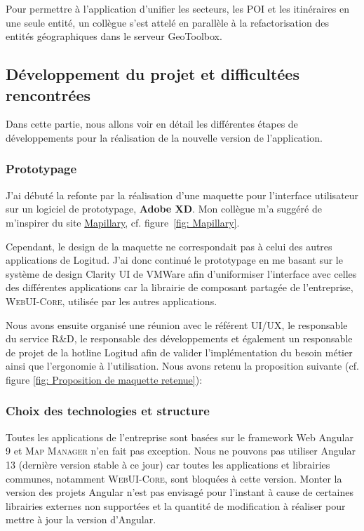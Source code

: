 \documentclass{rapportUHA40}
\begin{document}
Pour permettre à l'application d'unifier les secteurs, les POI et les
itinéraires en une seule entité, un collègue s'est attelé en parallèle à la
refactorisation des entités géographiques dans le serveur GeoToolbox.

\subsection{Développement du projet et difficultées rencontrées}
Dans cette partie, nous allons voir en détail les différentes étapes de
développements pour la réalisation de la nouvelle version de l'application.

\subsubsection{Prototypage}
J'ai débuté la refonte par la réalisation d'une maquette pour l'interface
utilisateur sur un logiciel de prototypage, \textbf{Adobe XD}. Mon collègue m'a
suggéré de m'inspirer du site \href{https://www.mapillary.com/app/}{Mapillary},
cf. figure~\ref{fig: Mapillary}.

Cependant, le design de la maquette ne correspondait pas à celui des autres
applications de Logitud. J'ai donc continué le prototypage en me basant sur le
système de design Clarity UI de VMWare afin d'uniformiser l'interface avec
celles des différentes applications car la librairie de composant partagée de
l'entreprise, \textsc{WebUI-Core}, utilisée par les autres applications.

Nous avons ensuite organisé une réunion avec le référent UI/UX, le responsable
du service R\&D, le responsable des développements et également un responsable
de projet de la hotline Logitud afin de valider l'implémentation du besoin
métier ainsi que l'ergonomie à l'utilisation. Nous avons retenu la proposition
suivante (cf. figure \ref{fig: Proposition de maquette retenue}):

\subsubsection{Choix des technologies et structure}
Toutes les applications de l'entreprise sont basées sur le framework Web
Angular 9 et \textsc{Map Manager} n'en fait pas exception. Nous ne pouvons pas
utiliser Angular 13 (dernière version stable à ce jour) car toutes les
applications et librairies communes, notamment \textsc{WebUI-Core}, sont
bloquées à cette version. Monter la version des projets Angular n'est pas
envisagé pour l'instant à cause de certaines librairies externes non supportées
et la quantité de modification à réaliser pour mettre à jour la version
d'Angular.
\end{document}
